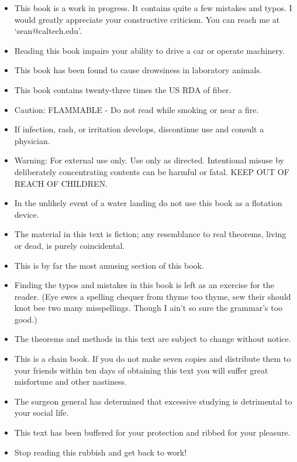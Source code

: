 \begin{itemize}
\item This book is a work in progress.  It contains quite a few
        mistakes and typos.  I would greatly appreciate your constructive
        criticism.  You can reach me at `sean@caltech.edu'.
%
\item Reading this book impairs your ability to drive a car or operate
machinery.
%
\item This book has been found to cause drowsiness in laboratory animals.
%
\item This book contains twenty-three times the US RDA of fiber.
%
\item Caution: FLAMMABLE - Do not read while smoking or near a fire.
%
\item If infection, rash, or irritation develops, discontinue use and consult
a physician.
%
\item Warning: For external use only.  Use only as directed.  Intentional
misuse by deliberately concentrating contents can be harmful or fatal.
KEEP OUT OF REACH OF CHILDREN.
%
\item In the unlikely event of a water landing do not use this book as a
flotation device.
%
\item The material in this text is fiction; any resemblance to real theorems,
living or dead, is purely coincidental.
%
\item This is by far the most amusing section of this book.
%
\item Finding the typos and mistakes in this book is left as an exercise
for the reader.  (Eye ewes a spelling chequer from thyme too thyme,
sew their should knot bee two many
misspellings.  Though I ain't so sure the grammar's too good.)
%
\item The theorems and methods in this text are subject to change without
notice.
%
\item  This is a chain book.  If you do not make seven copies and distribute
them to your friends within ten days of obtaining this text you will suffer
great misfortune and other nastiness.
%
\item
The surgeon general has determined that excessive studying is detrimental
to your social life.
%
\item
This text has been buffered for your protection and ribbed for your
pleasure.
%
\item Stop reading this rubbish and get back to work!
\end{itemize}





